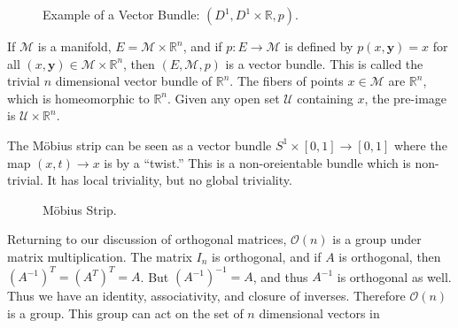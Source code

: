             \begin{figure}[H]
                \centering
                \captionsetup{type=figure}
                
                \caption{Example of a Vector Bundle:
                         $(D^{1},D^{1}\times\mathbb{R},p)$.}
                \label{fig:Simple_Vector_Bundle_Cylinder_to_Disk}
            \end{figure}
            \begin{example}
                If $\mathcal{M}$ is a manifold,
                $E=\mathcal{M}\times\mathbb{R}^{n}$, and if
                $p:E\rightarrow\mathcal{M}$ is defined by $p(x,\mathbf{y})=x$
                for all $(x,\mathbf{y})\in\mathcal{M}\times\mathbb{R}^{n}$,
                then $(E,\mathcal{M},p)$ is a vector bundle. This is called
                the trivial $n$ dimensional vector bundle of $\mathbb{R}^{n}$.
                The fibers of points $x\in\mathcal{M}$ are $\mathbb{R}^{n}$,
                which is homeomorphic to $\mathbb{R}^{n}$. Given any open set
                $\mathcal{U}$ containing $x$, the pre-image is
                $\mathcal{U}\times\mathbb{R}^{n}$.
            \end{example}
            \begin{example}
                The M\"{o}bius strip can be seen as a vector bundle
                $S^{1}\times[0,1]\rightarrow[0,1]$ where the map
                $(x,t)\rightarrow{x}$ is by a ``twist.'' This is a
                non-oreientable bundle which is non-trivial. It has local
                triviality, but no global triviality.
            \end{example}
            \begin{figure}[H]
                \centering
                \captionsetup{type=figure}
                
                \caption{M\"{o}bius Strip.}
                \label{fig:Surgery_Theory_Mobius_Strip_Vector_Bundle}
            \end{figure}
            Returning to our discussion of orthogonal matrices,
            $\mathcal{O}(n)$ is a group under matrix multiplication.
            The matrix $I_{n}$ is orthogonal, and if $A$ is orthogonal,
            then $(A^{-1})^{T}=(A^{T})^{T}=A$. But $(A^{-1})^{-1}=A$,
            and thus $A^{-1}$ is orthogonal as well. Thus we have
            an identity, associativity, and closure of inverses.
            Therefore $\mathcal{O}(n)$ is a group. This group can
            act on the set of $n$ dimensional vectors in
